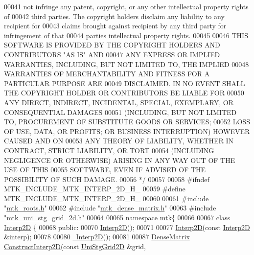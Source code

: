 \begin{DoxyCode}
00041 \textcolor{comment}{not infringe any patent, copyright, or any other intellectual property rights of}
00042 \textcolor{comment}{third parties. The copyright holders disclaim any liability to any recipient for}
00043 \textcolor{comment}{claims brought against recipient by any third party for infringement of that}
00044 \textcolor{comment}{parties intellectual property rights.}
00045 \textcolor{comment}{}
00046 \textcolor{comment}{THIS SOFTWARE IS PROVIDED BY THE COPYRIGHT HOLDERS AND CONTRIBUTORS "AS IS" AND}
00047 \textcolor{comment}{ANY EXPRESS OR IMPLIED WARRANTIES, INCLUDING, BUT NOT LIMITED TO, THE IMPLIED}
00048 \textcolor{comment}{WARRANTIES OF MERCHANTABILITY AND FITNESS FOR A PARTICULAR PURPOSE ARE}
00049 \textcolor{comment}{DISCLAIMED. IN NO EVENT SHALL THE COPYRIGHT HOLDER OR CONTRIBUTORS BE LIABLE FOR}
00050 \textcolor{comment}{ANY DIRECT, INDIRECT, INCIDENTAL, SPECIAL, EXEMPLARY, OR CONSEQUENTIAL DAMAGES}
00051 \textcolor{comment}{(INCLUDING, BUT NOT LIMITED TO, PROCUREMENT OF SUBSTITUTE GOODS OR SERVICES;}
00052 \textcolor{comment}{LOSS OF USE, DATA, OR PROFITS; OR BUSINESS INTERRUPTION) HOWEVER CAUSED AND ON}
00053 \textcolor{comment}{ANY THEORY OF LIABILITY, WHETHER IN CONTRACT, STRICT LIABILITY, OR TORT}
00054 \textcolor{comment}{(INCLUDING NEGLIGENCE OR OTHERWISE) ARISING IN ANY WAY OUT OF THE USE OF THIS}
00055 \textcolor{comment}{SOFTWARE, EVEN IF ADVISED OF THE POSSIBILITY OF SUCH DAMAGE.}
00056 \textcolor{comment}{*/}
00057 
00058 \textcolor{preprocessor}{#ifndef MTK\_INCLUDE\_MTK\_INTERP\_2D\_H\_}
00059 \textcolor{preprocessor}{#define MTK\_INCLUDE\_MTK\_INTERP\_2D\_H\_}
00060 
00061 \textcolor{preprocessor}{#include "\hyperlink{mtk__roots_8h}{mtk\_roots.h}"}
00062 \textcolor{preprocessor}{#include "\hyperlink{mtk__dense__matrix_8h}{mtk\_dense\_matrix.h}"}
00063 \textcolor{preprocessor}{#include "\hyperlink{mtk__uni__stg__grid__2d_8h}{mtk\_uni\_stg\_grid\_2d.h}"}
00064 
00065 \textcolor{keyword}{namespace }\hyperlink{namespacemtk}{mtk}\{
00066 
\hypertarget{mtk__interp__2d_8h_source_l00067}{}\hyperlink{classmtk_1_1Interp2D}{00067} \textcolor{keyword}{class }\hyperlink{classmtk_1_1Interp2D}{Interp2D} \{
00068  \textcolor{keyword}{public}:
00070   \hyperlink{classmtk_1_1Interp2D_a1ced84c0dbafdbe1cd3732d5a4848e10}{Interp2D}();
00071 
00077   \hyperlink{classmtk_1_1Interp2D_a1ced84c0dbafdbe1cd3732d5a4848e10}{Interp2D}(\textcolor{keyword}{const} \hyperlink{classmtk_1_1Interp2D}{Interp2D} &interp);
00078 
00080   \hyperlink{classmtk_1_1Interp2D_a037ed312b0baa2137a31984108e6907d}{~Interp2D}();
00081 
00087   \hyperlink{classmtk_1_1DenseMatrix}{DenseMatrix} \hyperlink{classmtk_1_1Interp2D_ae9a83433caa1fd62956cce0872a02fb8}{ConstructInterp2D}(\textcolor{keyword}{const} \hyperlink{classmtk_1_1UniStgGrid2D}{UniStgGrid2D} &grid,

\end{DoxyCode}
